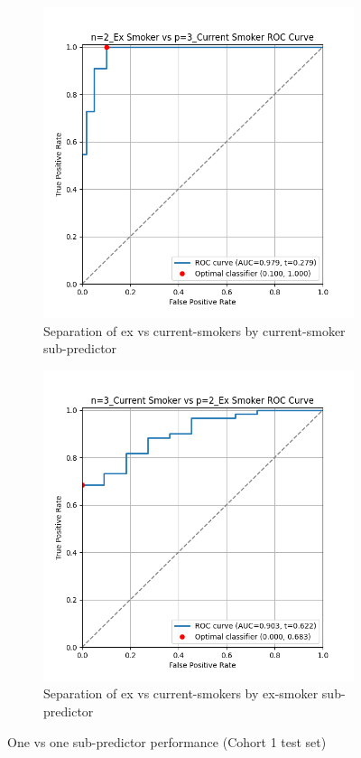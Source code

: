 \documentclass{article}
\begin{document}
\begin{figure}
    \begin{subfigure}{0.43\textwidth}
        \centering
        \includegraphics[width=\linewidth]{cohort1_2v3_roc.png}
        \caption{Separation of ex vs current-smokers by current-smoker sub-predictor}
    \end{subfigure}
    \hfill
    \begin{subfigure}{0.43\textwidth}
        \centering
        \includegraphics[width=\linewidth]{cohort1_3v2_roc.png}
        \caption{Separation of ex vs current-smokers by ex-smoker sub-predictor}
    \end{subfigure}
    \caption{One vs one sub-predictor performance (Cohort 1 test set)}
    \label{fig:ovo-roc-cohort1}
\end{figure}
\end{document}

